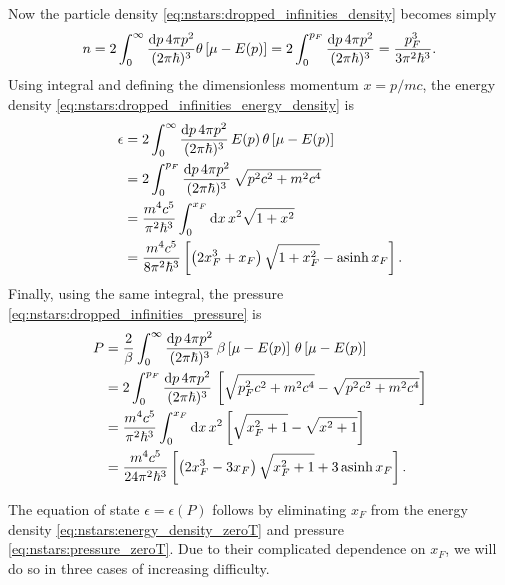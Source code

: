 Now the particle density \eqref{eq:nstars:dropped_infinities_density} becomes simply
\begin{equation}
	n = 
	2 \int_0^\infty \frac{\mathop{}\!\mathrm{d} p \, 4 \pi p^2}{(2 \pi \hbar)^3} \theta \left[ \mu - E(p) \right] =
	2 \int_0^{p_F} \frac{\mathop{}\!\mathrm{d} p \, 4 \pi p^2}{(2 \pi \hbar)^3} = \frac{p_F^3}{3 \pi^2 \hbar^3} .
\label{eq:nstars:density_zeroT}
\end{equation}
Using integral  and defining the dimensionless momentum $x = p / mc$, the energy density \eqref{eq:nstars:dropped_infinities_energy_density} is
\begin{equation}
\begin{split}
	\epsilon &=  2 \int_0^\infty \frac{\mathop{}\!\mathrm{d} p \, 4 \pi p^2}{(2 \pi \hbar)^3} \, E(p) \, \theta \left[ \mu - E(p) \right] \\
	         &=  2 \int_0^{p_F} \frac{\mathop{}\!\mathrm{d} p \, 4 \pi p^2}{(2 \pi \hbar)^3} \, \sqrt{p^2 c^2 + m^2 c^4} \\
	         &= \frac{m^4 c^5}{\pi^2 \hbar^3} \int_0^{x_F} \mathop{}\!\mathrm{d} x \, x^2 \sqrt{1 + x^2} \\
	         &= \frac{m^4 c^5}{8 \pi^2 \hbar^3} \left[ \left( 2 x_F^3 + x_F \right) \sqrt{1 + x_F^2} - \operatorname{asinh} x_F \right] . \\
\end{split}
\label{eq:nstars:energy_density_zeroT}
\end{equation}
Finally, using the same integral, the pressure \eqref{eq:nstars:dropped_infinities_pressure} is
\begin{equation}
\begin{split}
	P &= \frac{2}{\beta} \int_0^\infty \frac{\mathop{}\!\mathrm{d} p \, 4 \pi p^2}{(2 \pi \hbar)^3} \, \beta \left[ \mu - E(p) \right] \, \theta \left[ \mu - E(p) \right] \\
	  &= 2 \int_0^{p_F} \frac{\mathop{}\!\mathrm{d} p \, 4 \pi p^2}{(2 \pi \hbar)^3} \, \left[ \sqrt{p_F^2 c^2 + m^2 c^4} - \sqrt{p^2 c^2 + m^2 c^4} \right] \\
	  &= \frac{m^4 c^5}{\pi^2 \hbar^3} \int_0^{x_F} \mathop{}\!\mathrm{d} x \, x^2 \left[ \sqrt{x_F^2+1} - \sqrt{x^2+1} \right] \\
	  &= \frac{m^4 c^5}{24 \pi^2 \hbar^3} \left[ \left( 2 x_F^3 - 3 x_F \right) \sqrt{x_F^2 + 1} + 3 \operatorname{asinh} x_F \right] . \\
\end{split}
\label{eq:nstars:pressure_zeroT}
\end{equation}

The equation of state $\epsilon = \epsilon(P)$ follows by eliminating $x_F$ from the energy density \eqref{eq:nstars:energy_density_zeroT} and pressure \eqref{eq:nstars:pressure_zeroT}.
Due to their complicated dependence on $x_F$, we will do so in three cases of increasing difficulty.

